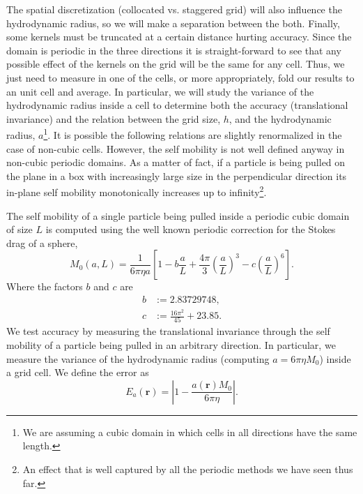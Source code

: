 \documentclass[ twoside,openright,titlepage,numbers=noenddot,%
headinclude,footinclude,cleardoublepage=empty,abstract=on,
BCOR=5mm,paper=a4,fontsize=11pt, dvipsnames
]{scrreprt}
\renewcommand{\vec}[1]{\bm{#1}}
\begin{document}
The spatial discretization (collocated vs. staggered grid) will also influence the hydrodynamic radius, so we will make a separation between the both.
Finally, some kernels must be truncated at a certain distance hurting accuracy.
Since the domain is periodic in the three directions it is straight-forward to see that any possible effect of the kernels on the grid will be the same for any cell. Thus, we just need to measure in one of the cells, or more appropriately, fold our results to an unit cell and average.
In particular, we will study the variance of the hydrodynamic radius inside a cell to determine both the accuracy (translational invariance) and the relation between the grid size, $h$, and the hydrodynamic radius, $a$\footnote{We are assuming a cubic domain in which cells in all directions have the same length.}. It is possible the following relations are slightly renormalized in the case of non-cubic cells. However, the self mobility is not well defined anyway in non-cubic periodic domains. As a matter of fact, if a particle is being pulled on the plane in a box with increasingly large size in the perpendicular direction its in-plane self mobility monotonically increases up to infinity\cite{Vogele2016}\footnote{An effect that is well captured by all the periodic methods we have seen thus far.}.

The self mobility of a single particle being pulled inside a periodic cubic domain of size $L$ is computed using the well known periodic correction for the Stokes drag of a sphere\cite{Hasimoto1959},
\begin{equation}
  \label{eq:selfmobpbc}
  M_{0}(a,L) = \frac{1}{6\pi\eta a}\left[1-b\frac{a}{L} + \frac{4\pi}{3}\left(\frac{a}{L}\right)^3 - c \left(\frac{a}{L}\right)^6\right].
\end{equation}
Where the factors $b$ and $c$ are
\begin{equation}
  \begin{aligned}
  b &:= 2.83729748,\\
  c &:= \frac{16\pi^2}{45} + 23.85.
  \end{aligned}
\end{equation}
We test accuracy by measuring the translational invariance through the self mobility of a particle being pulled in an arbitrary direction. In particular, we measure the variance of the hydrodynamic radius (computing $a = 6\pi\eta M_{0}$) inside a grid cell.
We define the error as
\begin{equation}
  \label{hydroerr}
  E_a(\vec{r}) = \left|1 - \frac{a(\vec{r})M_{0}}{6\pi\eta}\right|.
\end{equation}
\end{document}
